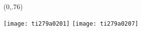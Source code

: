 \begin{textblock}{1}(0,.76)
	\begin{center}
		\texttt{[image: ti279a0201]}
		\texttt{[image: ti279a0207]}
	\end{center}
\end{textblock}

\null\newpage\pagestyle{nexus}